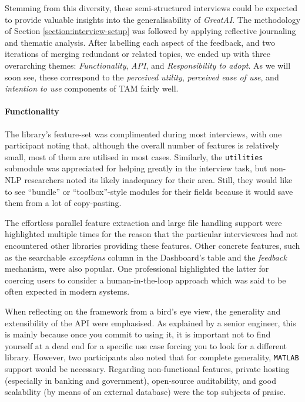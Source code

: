 Stemming from this diversity, these semi-structured interviews could be expected to provide valuable insights into the generalisability of \textit{GreatAI}. The methodology of Section \ref{section:interview-setup} was followed by applying reflective journaling and thematic analysis. After labelling each aspect of the feedback, and two iterations of merging redundant or related topics, we ended up with three overarching themes: \textit{Functionality}, \textit{API}, and \textit{Responsibility to adopt}. As we will soon see, these correspond to the \textit{perceived utility}, \textit{perceived ease of use}, and \textit{intention to use} components of TAM fairly well.

\paragraph{Functionality} The library's feature-set was complimented during most interviews, with one participant noting that, although the overall number of features is relatively small, most of them are utilised in most cases. Similarly, the \texttt{utilities} submodule was appreciated for helping greatly in the interview task, but non-NLP researchers noted its likely inadequacy for their area. Still, they would like to see ``bundle'' or ``toolbox''-style modules for their fields because it would save them from a lot of copy-pasting.

The effortless parallel feature extraction and large file handling support were highlighted multiple times for the reason that the particular interviewees had not encountered other libraries providing these features. Other concrete features, such as the searchable \textit{exceptions} column in the Dashboard's table and the \textit{feedback} mechanism, were also popular. One professional highlighted the latter for coercing users to consider a human-in-the-loop approach which was said to be often expected in modern systems.

When reflecting on the framework from a bird's eye view, the generality and extensibility of the API were emphasised. As explained by a senior engineer, this is mainly because once you commit to using it, it is important not to find yourself at a dead end for a specific use case forcing you to look for a different library. However, two participants also noted that for complete generality, \texttt{MATLAB} support would be necessary. Regarding non-functional features, private hosting (especially in banking and government), open-source auditability, and good scalability (by means of an external database) were the top subjects of praise.

